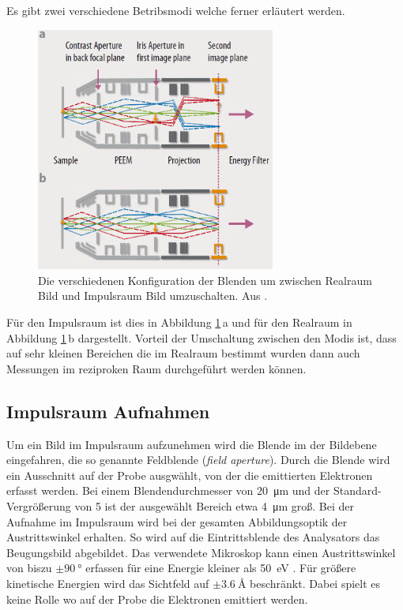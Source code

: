         Es gibt zwei verschiedene Betribsmodi welche ferner erläutert werden.
        \begin{figure}
            \centering
            \caption{Die verschiedenen Konfiguration der Blenden um zwischen Realraum Bild und Impulsraum Bild umzuschalten. Aus \cite{Focus}.}
            \label{fig:real_k}
            \includegraphics[width=0.7\textwidth]{./content/Real_k.PNG}
        \end{figure}
        Für den Impulsraum ist dies in Abbildung \ref{fig:real_k}\,a und für den Realraum in Abbildung \ref{fig:real_k}\,b dargestellt.
        Vorteil der Umschaltung zwischen den Modis ist, dass auf sehr kleinen Bereichen die im Realraum bestimmt wurden dann auch Messungen im reziproken Raum durchgeführt werden können.


        \subsection{Impulsraum Aufnahmen}
            Um ein Bild im Impulsraum aufzunehmen wird die Blende im der Bildebene eingefahren, die so genannte Feldblende (\textit{field aperture}).
            Durch die Blende wird ein Ausschnitt auf der Probe ausgwählt, von der die emittierten Elektronen erfasst werden.
            Bei einem Blendendurchmesser von \SI{20}{\micro\meter} und der Standard-Vergrößerung von \num{5} ist der ausgewählt Bereich etwa \SI{4}{\micro\meter} groß.
            Bei der Aufnahme im Impulsraum wird bei der gesamten Abbildungsoptik der Austrittswinkel erhalten.
            So wird auf die Eintrittsblende des Analysators das Beugungsbild abgebildet.
            Das verwendete Mikroskop kann einen Austrittswinkel von biszu $\pm\SI{90}{\degree}$ erfassen für eine Energie kleiner als \SI{50}{\electronvolt} \cite[21]{SPECS-MM}.
            Für größere kinetische Energien wird das Sichtfeld auf $\pm\SI{3.6}{\angstrom}$ beschränkt.
            Dabei spielt es keine Rolle wo auf der Probe die Elektronen emittiert werden.

